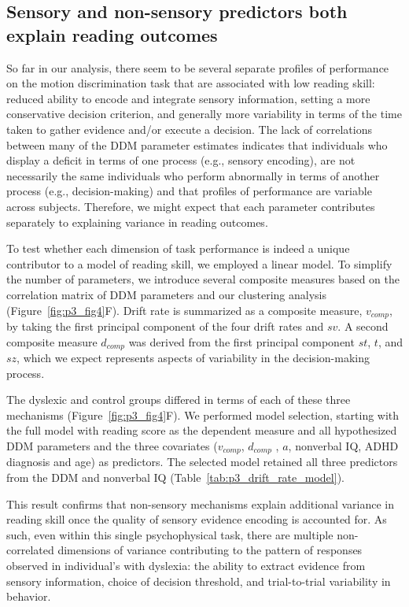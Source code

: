 \documentclass[../uwthesis.tex]{subfiles}
\begin{document}
\subsection{Sensory and non-sensory predictors both explain reading outcomes}
So far in our analysis, there seem to be several separate profiles of performance on the
motion discrimination task that are associated with low reading skill: reduced ability to encode
and integrate sensory information, setting a more conservative decision criterion, and generally
more variability in terms of the time taken to gather evidence and/or execute a decision. The lack
of correlations between many of the DDM parameter estimates indicates that individuals who
display a deficit in terms of one process (e.g., sensory encoding), are not necessarily the same
individuals who perform abnormally in terms of another process (e.g., decision-making) and that
profiles of performance are variable across subjects. Therefore, we might expect that each
parameter contributes separately to explaining variance in reading outcomes.

To test whether each dimension of task performance is indeed a unique contributor to a
model of reading skill, we employed a linear model. To simplify the number of parameters, we
introduce several composite measures based on the correlation matrix of DDM parameters and our
clustering analysis (Figure~\ref{fig:p3_fig4}F). Drift rate is summarized as a composite measure, $v_{comp}$, by taking the first principal component of the four drift rates and $sv$. A second composite measure $d_{comp}$ was
derived from the first principal component $st$, $t$, and $sz$, which we expect represents aspects of
variability in the decision-making process.

The dyslexic and control groups differed in terms of each of these three mechanisms
(Figure~\ref{fig:p3_fig4}F). We performed model selection, starting with the full model with reading score as the
dependent measure and all hypothesized DDM parameters and the three covariates ($v_{comp}$, $d_{comp}$ , $a$,
nonverbal IQ, ADHD diagnosis and age) as predictors. The selected model retained all three
predictors from the DDM and nonverbal IQ (Table~\ref{tab:p3_drift_rate_model}).

This result confirms that non-sensory mechanisms explain additional variance in reading
skill once the quality of sensory evidence encoding is accounted for. As such, even within this
single psychophysical task, there are multiple non-correlated dimensions of variance contributing
to the pattern of responses observed in individual’s with dyslexia: the ability to extract evidence
from sensory information, choice of decision threshold, and trial-to-trial variability in behavior.
\end{document}
